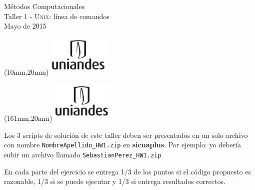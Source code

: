 \documentclass[11pt,letterpaper]{exam}
\begin{document}
\begin{center}
{\Large Métodos Computacionales} \\
Taller 1 - \textsc{Unix}: línea de comandos \\
Mayo de 2015
\end{center}

\begin{textblock*}{40mm}(10mm,20mm)
  \includegraphics[width=3cm]{logoUniandes.png}
\end{textblock*}

\begin{textblock*}{40mm}(161mm,20mm)
  \includegraphics[width=3cm]{logoUniandes.png}
\end{textblock*}

\vspace{0.5cm}

Los 3 scripts de solución de este taller deben ser presentados en un solo archivo con nombre \verb+NombreApellido_HW1.zip+ en \textbf{sicuaplus}. Por ejemplo: yo deber\'ia subir un archivo llamado \verb"SebastianPerez_HW1.zip"

En cada parte del ejercicio se entrega 1/3  de los puntos si el código propuesto es razonable, 1/3 si se puede ejecutar y 1/3 si entrega resultados correctos.

\vspace{0.5cm}
\end{document}
